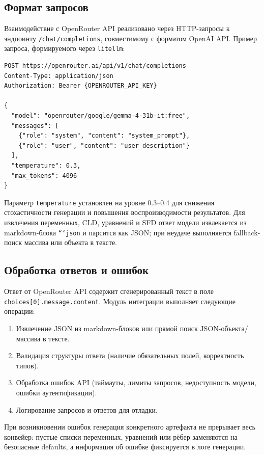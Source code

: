 \subsection{Формат запросов}

Взаимодействие с OpenRouter API реализовано через HTTP-запросы к эндпоинту \texttt{/chat/completions}, совместимому с форматом OpenAI API. Пример запроса, формируемого через \texttt{litellm}:

\begin{lstlisting}[caption={Пример запроса к OpenRouter API}]
POST https://openrouter.ai/api/v1/chat/completions
Content-Type: application/json
Authorization: Bearer {OPENROUTER_API_KEY}

{
  "model": "openrouter/google/gemma-4-31b-it:free",
  "messages": [
    {"role": "system", "content": "system_prompt"},
    {"role": "user", "content": "user_description"}
  ],
  "temperature": 0.3,
  "max_tokens": 4096
}
\end{lstlisting}

Параметр \texttt{temperature} установлен на уровне 0.3--0.4 для снижения стохастичности генерации и повышения воспроизводимости результатов. Для извлечения переменных, CLD, уравнений и SFD ответ модели извлекается из markdown-блока \texttt{```json} и парсится как JSON; при неудаче выполняется fallback-поиск массива или объекта в тексте.

\subsection{Обработка ответов и ошибок}

Ответ от OpenRouter API содержит сгенерированный текст в поле \texttt{choices[0].message.content}. Модуль интеграции выполняет следующие операции:

\begin{enumerate}
    \item Извлечение JSON из markdown-блоков или прямой поиск JSON-объекта/массива в тексте.
    \item Валидация структуры ответа (наличие обязательных полей, корректность типов).
    \item Обработка ошибок API (таймауты, лимиты запросов, недоступность модели, ошибки аутентификации).
    \item Логирование запросов и ответов для отладки.
\end{enumerate}

При возникновении ошибок генерация конкретного артефакта не прерывает весь конвейер: пустые списки переменных, уравнений или рёбер заменяются на безопасные defaults, а информация об ошибке фиксируется в логе генерации.


